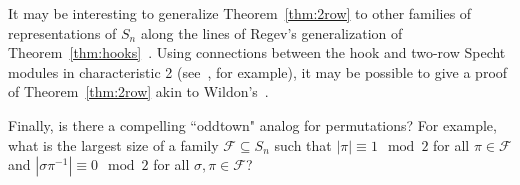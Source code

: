\documentclass[12pt]{article}
\begin{document}
It may be interesting to generalize Theorem~\ref{thm:2row} to other families of representations of $S_n$ along the lines of Regev's generalization of Theorem~\ref{thm:hooks}~\cite{Regev13}. Using connections between the hook and two-row Specht modules in characteristic 2 (see~\cite{Kapadia25,Murphy82,Peel71}, for example), it may be possible to give a proof of Theorem~\ref{thm:2row}  akin to Wildon's~\cite{WildonBlog}. 

Finally, is there a compelling ``oddtown" analog for permutations? For example, what is the largest size of a family $\mathcal{F} \subseteq S_n$ such that $|\pi | \equiv 1 \mod 2$ for all $\pi  \in \mathcal{F}$ and $|\sigma\pi^{-1}| \equiv 0 \mod 2$ for all $\sigma, \pi \in \mathcal{F}$? 

\end{document}
